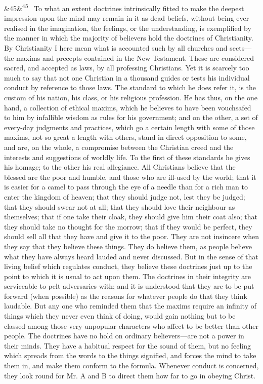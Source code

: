 \documentclass[12pt]{article}
\newcommand{\para}[1][]{\par\noindent\ifx&#1&\else\textsuperscript{\footnotesize #1}~\fi}
\begin{document}
\para[45] To what an extent doctrines intrinsically fitted to make the deepest impression upon the mind may remain in it as dead beliefs, without being ever realised in the imagination, the feelings, or the understanding, is exemplified by the manner in which the majority of believers hold the doctrines of Christianity. By Christianity I here mean what is accounted such by all churches and sects---the maxims and precepts contained in the New Testament. These are considered sacred, and accepted as laws, by all professing Christians. Yet it is scarcely too much to say that not one Christian in a thousand guides or tests his individual conduct by reference to those laws. The standard to which he does refer it, is the custom of his nation, his class, or his religious profession. He has thus, on the one hand, a collection of ethical maxims, which he believes to have been vouchsafed to him by infallible wisdom as rules for his government; and on the other, a set of every-day judgments and practices, which go a certain length with some of those maxims, not so great a length with others, stand in direct opposition to some, and are, on the whole, a compromise between the Christian creed and the interests and suggestions of worldly life. To the first of these standards he gives his homage; to the other his real allegiance. All Christians believe that the blessed are the poor and humble, and those who are ill-used by the world; that it is easier for a camel to pass through the eye of a needle than for a rich man to enter the kingdom of heaven; that they should judge not, lest they be judged; that they should swear not at all; that they should love their neighbour as themselves; that if one take their cloak, they should give him their coat also; that they should take no thought for the morrow; that if they would be perfect, they should sell all that they have and give it to the poor. They are not insincere when they say that they believe these things. They do believe them, as people believe what they have always heard lauded and never discussed. But in the sense of that living belief which regulates conduct, they believe these doctrines just up to the point to which it is usual to act upon them. The doctrines in their integrity are serviceable to pelt adversaries with; and it is understood that they are to be put forward (when possible) as the reasons for whatever people do that they think laudable. But any one who reminded them that the maxims require an infinity of things which they never even think of doing, would gain nothing but to be classed among those very unpopular characters who affect to be better than other people. The doctrines have no hold on ordinary believers---are not a power in their minds. They have a habitual respect for the sound of them, but no feeling which spreads from the words to the things signified, and forces the mind to take them in, and make them conform to the formula. Whenever conduct is concerned, they look round for Mr. A and B to direct them how far to go in obeying Christ.
\end{document}
